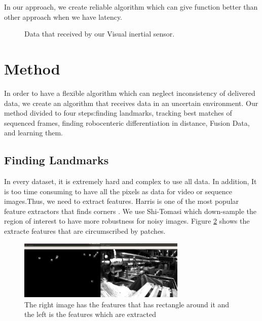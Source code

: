 \documentclass[a4paper,twoside]{article}
\begin{document}
 In our approach, we create reliable algorithm which can give function better than other approach when we have latency.
 




\begin{figure}[!h]
  \centering
   {}
  \caption{Data that received by our Visual inertial sensor.}
  \label{fig:incons}
 \end{figure}
 
 
 
 \section{Method}
 In order to have a flexible algorithm which can neglect inconsistency of delivered data, we create an algorithm that receives data in an uncertain environment. Our method divided to four steps:finding landmarks, tracking best matches of sequenced frames, finding robocenteric differentiation in distance, Fusion Data, and learning them. 
 
 \subsection{Finding Landmarks}
 In every dataset, it is extremely hard and complex to use all data. In addition, It is too time consuming to have all the pixels as data for video or sequence images.Thus, we need to extract features. Harris is one of the most popular feature extractors that finds corners \cite{harris1988combined}. We use Shi-Tomasi \cite{shi1993good} which down-sample the region of interest to have more robustness for noisy images\cite{rovio17}.
 Figure \ref{fig:featuret} shows the extracte features that are circumscribed by patches.
 \begin{figure}
 \includegraphics[width=80mm]{feature.jpg}
   \caption{The right image has the features that has rectangle around it and the left is the features which are extracted}
   \label{fig:featuret}
 \end{figure}
 
\end{document}
